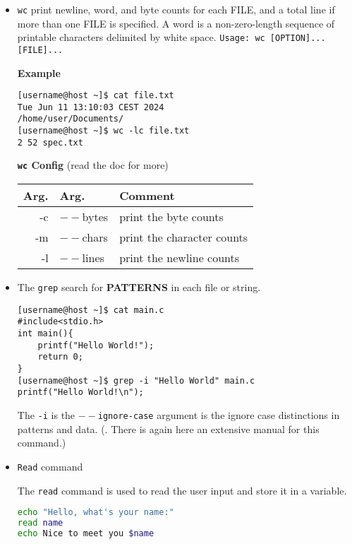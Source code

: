 \documentclass{article}
\newcommand{\inlinecode}[1]{\colorbox{backcolour}{\footnotesize{\texttt{#1}}}}
\begin{document}
\begin{itemize}
	\item \raggedright \inlinecode{wc} print newline, word, and byte counts for each FILE, and a total line if more than one FILE is specified.  A word is a non-zero-length sequence of printable characters delimited by white space. \inlinecode{Usage: wc [OPTION]... [FILE]...}
	      \begin{paracol}{2}
		      \textbf{Example}
		      \begin{lstlisting}[style=terminal]
[username@host ~]$ cat file.txt
Tue Jun 11 13:10:03 CEST 2024
/home/user/Documents/
[username@host ~]$ wc -lc file.txt
2 52 spec.txt
\end{lstlisting}
		      \switchcolumn
		      \textbf{\inlinecode{wc} Config} (read the doc for more)
		      \footnotesize{
			      \begin{tabularx}{\linewidth}{| r | >{\raggedright\arraybackslash}X |>{\raggedright\arraybackslash}X |}\hline
				      \textbf{Arg.} & \textbf{Arg.} & \textbf{Comment}           \\\hline
				      -c            & \(--\)bytes   & print the byte counts      \\\hline
				      -m            & \(--\)chars   & print the character counts \\\hline
				      -l            & \(--\)lines   & print the newline counts   \\\hline
			      \end{tabularx}}
	      \end{paracol}
	\item The \inlinecode{grep} search for \textbf{PATTERNS} in each file or string.
	      \begin{lstlisting}[style=terminal]
[username@host ~]$ cat main.c
#include<stdio.h>
int main(){
    printf("Hello World!");
    return 0;
}
[username@host ~]$ grep -i "Hello World" main.c
printf("Hello World!\n");
    \end{lstlisting}
	      The \inlinecode{-i} is the \inlinecode{\(--\)ignore-case} argument is the ignore case distinctions in patterns and data. (\faWarning. There is again here an extensive manual for this command.)


	\item \inlinecode{Read} command

	      \begin{paracol}{2}

		      The \inlinecode{read} command is used to read the user input and store it in a variable.

		      \begin{lstlisting}[style=command, language=bash]
echo "Hello, what's your name:"
read name
echo Nice to meet you $name
\end{lstlisting}


\end{paracol}
\end{itemize}
\end{document}
